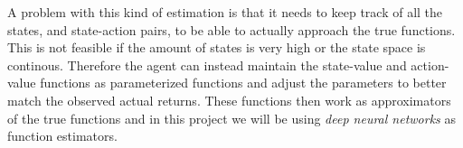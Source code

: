 \documentclass[11pt]{article}
\begin{document}
A problem with this kind of estimation is that it needs to keep track of all the states, and state-action
pairs, to be able to actually approach the true functions.
This is not feasible if the amount of states is very high or the state space is continous.
Therefore the agent can instead maintain the state-value and action-value functions as
parameterized functions and adjust the parameters to better match the observed actual returns\cite{RLbook}.
These functions then work as approximators of the true functions and in this project we will
be using \textit{deep neural networks} as function estimators.



%
%
\end{document}
